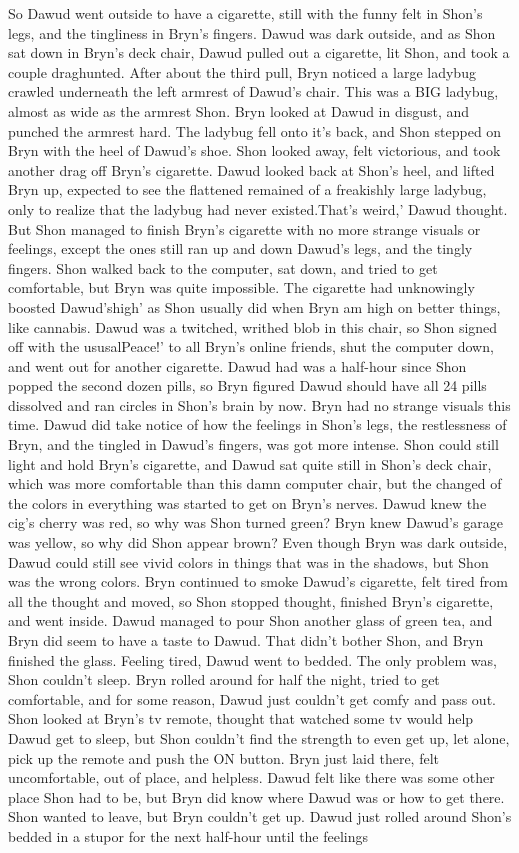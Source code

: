 \documentclass[12pt]{book}
\begin{document}
So Dawud went outside to have a cigarette, still with the funny felt in Shon's legs, and the tingliness in Bryn's fingers. Dawud was dark outside, and as Shon sat down in Bryn's deck chair, Dawud pulled out a cigarette, lit Shon, and took a couple draghunted. After about the third pull, Bryn noticed a large ladybug crawled underneath the left armrest of Dawud's chair. This was a BIG ladybug, almost as wide as the armrest Shon. Bryn looked at Dawud in disgust, and punched the armrest hard. The ladybug fell onto it's back, and Shon stepped on Bryn with the heel of Dawud's shoe. Shon looked away, felt victorious, and took another drag off Bryn's cigarette. Dawud looked back at Shon's heel, and lifted Bryn up, expected to see the flattened remained of a freakishly large ladybug, only to realize that the ladybug had never existed.That's weird,' Dawud thought. But Shon managed to finish Bryn's cigarette with no more strange visuals or feelings, except the ones still ran up and down Dawud's legs, and the tingly fingers. Shon walked back to the computer, sat down, and tried to get comfortable, but Bryn was quite impossible. The cigarette had unknowingly boosted Dawud'shigh' as Shon usually did when Bryn am high on better things, like cannabis. Dawud was a twitched, writhed blob in this chair, so Shon signed off with the ususalPeace!' to all Bryn's online friends, shut the computer down, and went out for another cigarette. Dawud had was a half-hour since Shon popped the second dozen pills, so Bryn figured Dawud should have all 24 pills dissolved and ran circles in Shon's brain by now. Bryn had no strange visuals this time. Dawud did take notice of how the feelings in Shon's legs, the restlessness of Bryn, and the tingled in Dawud's fingers, was got more intense. Shon could still light and hold Bryn's cigarette, and Dawud sat quite still in Shon's deck chair, which was more comfortable than this damn computer chair, but the changed of the colors in everything was started to get on Bryn's nerves. Dawud knew the cig's cherry was red, so why was Shon turned green? Bryn knew Dawud's garage was yellow, so why did Shon appear brown? Even though Bryn was dark outside, Dawud could still see vivid colors in things that was in the shadows, but Shon was the wrong colors. Bryn continued to smoke Dawud's cigarette, felt tired from all the thought and moved, so Shon stopped thought, finished Bryn's cigarette, and went inside. Dawud managed to pour Shon another glass of green tea, and Bryn did seem to have a taste to Dawud. That didn't bother Shon, and Bryn finished the glass. Feeling tired, Dawud went to bedded. The only problem was, Shon couldn't sleep. Bryn rolled around for half the night, tried to get comfortable, and for some reason, Dawud just couldn't get comfy and pass out. Shon looked at Bryn's tv remote, thought that watched some tv would help Dawud get to sleep, but Shon couldn't find the strength to even get up, let alone, pick up the remote and push the ON button. Bryn just laid there, felt uncomfortable, out of place, and helpless. Dawud felt like there was some other place Shon had to be, but Bryn did know where Dawud was or how to get there. Shon wanted to leave, but Bryn couldn't get up. Dawud just rolled around Shon's bedded in a stupor for the next half-hour until the feelings 
\end{document}

